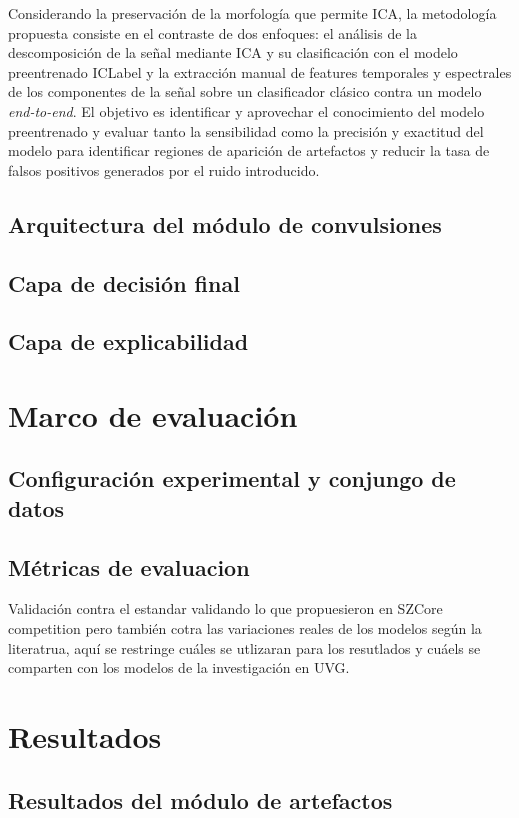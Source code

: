 Considerando la preservación de la morfología que permite ICA, la metodología propuesta consiste en el contraste de dos enfoques: el análisis de la descomposición de la señal mediante ICA y su clasificación con el modelo preentrenado ICLabel \cite{} 
y la extracción manual de features temporales y espectrales de los componentes de la señal sobre un clasificador clásico contra un modelo \textit{end-to-end}.
El objetivo es identificar y aprovechar el conocimiento del modelo preentrenado y evaluar tanto la sensibilidad como la precisión y exactitud del modelo para identificar regiones de aparición de artefactos y reducir la tasa de falsos positivos generados por el ruido introducido.


\section{Arquitectura del módulo de convulsiones}


\section{Capa de decisión final}

\section{Capa de explicabilidad}

\chapter{Marco de evaluación}
\section{Configuración experimental y conjungo de datos}

\section{Métricas de evaluacion}
Validación contra el estandar validando lo que propuesieron en SZCore competition pero también cotra las variaciones reales de los modelos según la literatrua, aquí se restringe cuáles se utlizaran para los resutlados y cuáels se comparten con los modelos de la investigación en UVG.

\chapter{Resultados}
\section{Resultados del módulo de artefactos}

